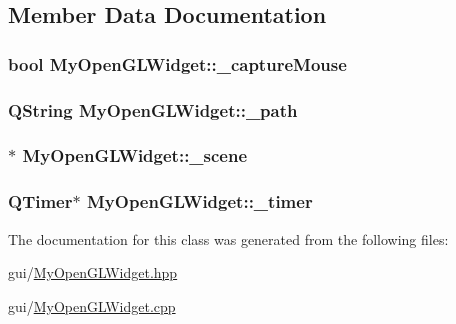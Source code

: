 \subsection{Member Data Documentation}
\hypertarget{class_my_open_g_l_widget_af001d889fec5469aa3e67c11ae48b29d}{
\subsubsection[{\+\_\+capture\+Mouse}]{\setlength{\rightskip}{0pt plus 5cm}bool My\+Open\+G\+L\+Widget\+::\+\_\+capture\+Mouse\hspace{0.3cm}{\ttfamily [private]}}}\label{class_my_open_g_l_widget_af001d889fec5469aa3e67c11ae48b29d}
\hypertarget{class_my_open_g_l_widget_a7b3d69ddf0b3509a196edbfeb78407c6}{
\subsubsection[{\+\_\+path}]{\setlength{\rightskip}{0pt plus 5cm}Q\+String My\+Open\+G\+L\+Widget\+::\+\_\+path\hspace{0.3cm}{\ttfamily [private]}}}\label{class_my_open_g_l_widget_a7b3d69ddf0b3509a196edbfeb78407c6}
\hypertarget{class_my_open_g_l_widget_a26a1f259357dd7c8822d715d81591395}{
\subsubsection[{\+\_\+scene}]{$\ast$ My\+Open\+G\+L\+Widget\+::\+\_\+scene\hspace{0.3cm}{\ttfamily [private]}}}\label{class_my_open_g_l_widget_a26a1f259357dd7c8822d715d81591395}
\hypertarget{class_my_open_g_l_widget_aa6ba509f0ef6e8c2d266b83e1d380eb8}{
\subsubsection[{\+\_\+timer}]{\setlength{\rightskip}{0pt plus 5cm}Q\+Timer$\ast$ My\+Open\+G\+L\+Widget\+::\+\_\+timer\hspace{0.3cm}{\ttfamily [private]}}}\label{class_my_open_g_l_widget_aa6ba509f0ef6e8c2d266b83e1d380eb8}


The documentation for this class was generated from the following files\+:\begin{DoxyCompactItemize}
\item 
gui/\hyperlink{_my_open_g_l_widget_8hpp}{My\+Open\+G\+L\+Widget.\+hpp}\item 
gui/\hyperlink{_my_open_g_l_widget_8cpp}{My\+Open\+G\+L\+Widget.\+cpp}\end{DoxyCompactItemize}
